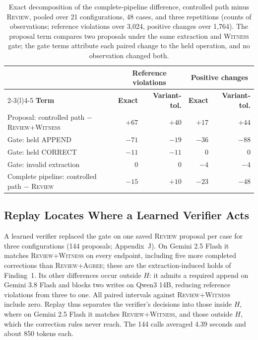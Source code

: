 \documentclass[acmsmall,review]{acmart}
\newcommand{\agree}{\textsc{Agree}}
\newcommand{\witness}{\textsc{Witness}}
\newcommand{\review}{\textsc{Review}}
\begin{document}
\begin{table}[tbp]
\centering
\caption{Exact decomposition of the complete-pipeline difference, controlled path minus \review{}, pooled over 21 configurations, 48 cases, and three repetitions (counts of observations; reference violations over 3,024, positive changes over 1,764). The proposal term compares two proposals under the same extraction and \witness{} gate; the gate terms attribute each paired change to the held operation, and no observation changed both.}\label{tab:12}
\small
\setlength{\tabcolsep}{3pt}
\begin{tabular}{@{}lrrrr@{}}
\toprule
 & \multicolumn{2}{c}{\textbf{Reference violations}} & \multicolumn{2}{c}{\textbf{Positive changes}} \\
\cmidrule(lr){2-3}\cmidrule(l){4-5}
\textbf{Term} & \textbf{Exact} & \textbf{Variant-tol.} & \textbf{Exact} & \textbf{Variant-tol.} \\
\midrule
Proposal: controlled path $-$ \review{}+\witness{} & $+67$ & $+40$ & $+17$ & $+44$ \\
Gate: held APPEND & $-71$ & $-19$ & $-36$ & $-88$ \\
Gate: held CORRECT & $-11$ & $-11$ & 0 & 0 \\
Gate: invalid extraction & 0 & 0 & $-4$ & $-4$ \\
\addlinespace[2pt]
Complete pipeline: controlled path $-$ \review{} & $-15$ & $+10$ & $-23$ & $-48$ \\
\bottomrule
\end{tabular}
\end{table}


\subsection{Replay Locates Where a Learned Verifier Acts}\label{sec:verifier}
A learned verifier \cite{cite46} replaced the gate on one saved \review{} proposal per case for three configurations (144 proposals; Appendix~J). On Gemini 2.5 Flash it matches \review{}+\witness{} on every endpoint, including five more completed corrections than \review{}+\agree{}; these are the extraction-induced holds of Finding~1. Its other differences occur outside $H$: it admits a required append on Gemini 3.8 Flash and blocks two writes on Qwen3 14B, reducing reference violations from three to one. All paired intervals against \review{}+\witness{} include zero. Replay thus separates the verifier's decisions into those inside $H$, where on Gemini 2.5 Flash it matches \review{}+\witness{}, and those outside $H$, which the correction rules never reach. The 144 calls averaged 4.39 seconds and about 850 tokens each.
\end{document}
